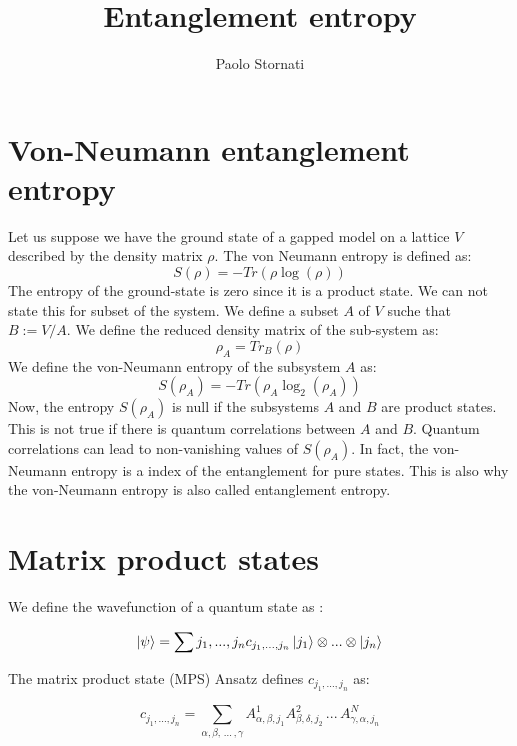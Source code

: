 \documentclass[11pt]{article}
\title{Entanglement entropy}
\date{}
\theoremstyle{definition}
\begin{document}
\author{Paolo Stornati}
\maketitle

\section{Von-Neumann entanglement entropy}

Let us suppose we have the ground state of a gapped model on a lattice $V$ described by the density matrix $\rho$. The von  Neumann entropy is defined as:
\begin{equation} 
S(\rho)=-Tr(\rho\log(\rho))
\end{equation}
The entropy of the ground-state is zero since it is a product state. We can not state this for subset of the system. 
We define a subset $A$ of $V$ suche that $B:=V / A $. We define the reduced density matrix of the sub-system as:
\begin{equation} \label{eq:Apartition}
\rho_A=Tr_B(\rho)
\end{equation}
We define the von-Neumann entropy of the subsystem $A$ as:
\begin{equation}
S(\rho_A)=-Tr(\rho_A\log_2(\rho_A))
\end{equation}
Now, the entropy $S(\rho_A)$ is null if the subsystems $A$ and $B$ are product states. This is not true if there is quantum correlations between $A$ and $B$. Quantum correlations can lead to non-vanishing values of $S(\rho_A)$. In fact, the von-Neumann entropy is a index of the entanglement for pure states. This is also why the von-Neumann entropy is also called entanglement entropy. 
\section{Matrix product states}

We define the wavefunction of a quantum state as \cite{Schollw_ck_2011}:

\begin{equation}  
\ket \psi = \sum{j_1,...,j_n} c_{j_1,...,j_n}  \ket{j_1} \otimes ... \otimes \ket{j_n}
\end{equation}

The matrix product state (MPS) Ansatz defines $c_{j_1,...,j_n}$ as:

\begin{equation}  
c_{j_1,...,j_n}= \sum_{\alpha , \beta, \, ... \, , \gamma } A^{1}_{\alpha , \beta , j_1} A^{2}_{ \beta , \delta ,  j_2} \, ... \, A^{N}_{  \gamma , \alpha ,j_n}
\end{equation}
\end{document}
